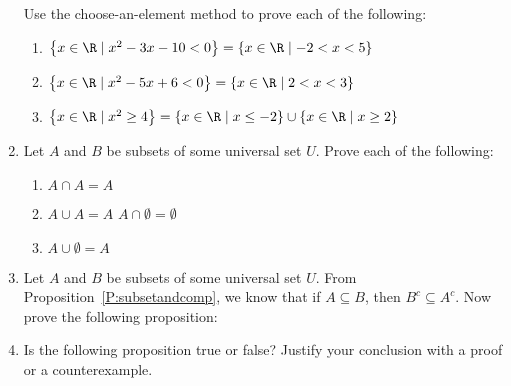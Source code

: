 \begin{enumerate}
Use the choose-an-element method to prove each of the following:
\begin{enumerate}
\item $\left\{x \in \R \mid x^2 - 3x - 10 < 0 \right\} = \left\{ x \in \R \mid -2 < x < 5 \right\}$
\item $\left\{x \in \R \mid x^2 - 5x + 6 < 0 \right\} = \left\{ x \in \R \mid 2 < x < 3 \right\}$
\item $\left\{ x \in \R \mid x^2 \geq 4 \right\} = \left\{ x \in \R \mid x \leq -2 \right\} \cup \left\{ x \in \R \mid x \geq 2 \right\}$
\end{enumerate} 

\item Let  $A$  and  $B$  be subsets of some universal set  $U$.  Prove each of the following: 
\label{exer:intersectandunion}
\begin{multicols}{3}
\begin{enumerate}
  \yitem $A \cap B \subseteq A$
  \yitem $A \subseteq A \cup B$
  \item $A \cap A = A$
  \item $A \cup A = A$
  \yitem $A \cap \emptyset  = \emptyset $
  \item $A \cup \emptyset  = A$
\end{enumerate}
\end{multicols}


\item Let  $A$  and  $B$  be subsets of some universal set  $U$.  From 
Proposition~\ref{P:subsetandcomp}, we know that if  $A \subseteq B$, then  
$B^c  \subseteq A^c$.  Now prove the following proposition: \label{exer:sec43-2}


\item Is the following proposition true or false?  Justify your conclusion with a proof or a counterexample.
\label{exer:sec42-6}%




\end{enumerate}
